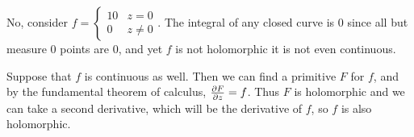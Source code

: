 \documentclass{homework}
\begin{document}
                                                                                                                                                                                                                                                                                                                                                                  \begin{solution}
                                                                                                                                                                                                                                                                                                                                                                  No, consider $f = \begin{cases}10 & z=0\\ 0 & z\neq 0\end{cases}$. The integral of any closed curve is 0 since all but measure 0 points are 0, and yet $f$ is not holomorphic it is not even continuous.

                                                                                                                                                                                                                                                                                                                                                                  Suppose that $f$ is continuous as well. Then we can find a primitive $F$ for $f$, and by the fundamental theorem of calculus, $\frac{\partial F}{\partial z} = f$. Thus $F$ is holomorphic and we can take a second derivative, which will be the derivative of $f$, so $f$ is also holomorphic.
                                                                                                                                                                                                                                                                                                                                                                  \end{solution}
\end{document}
